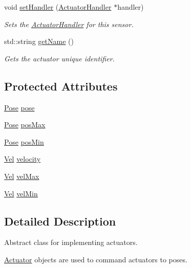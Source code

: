 \begin{DoxyCompactItemize}
void \hyperlink{classrlib_1_1Actuator_af3c3a5a5de2ab54d6b06fe223ec5e7e6}{set\-Handler} (\hyperlink{classrlib_1_1ActuatorHandler}{Actuator\-Handler} $\ast$handler)
\begin{DoxyCompactList}\small\item\em Sets the \hyperlink{classrlib_1_1ActuatorHandler}{Actuator\-Handler} for this sensor. \end{DoxyCompactList}\item 
std\-::string \hyperlink{classrlib_1_1Actuator_af4694ce3e4474e27bda1ed39cc048b6e}{get\-Name} ()
\begin{DoxyCompactList}\small\item\em Gets the actuator unique identifier. \end{DoxyCompactList}\end{DoxyCompactItemize}
\subsection*{Protected Attributes}
\begin{DoxyCompactItemize}
\item 
\hyperlink{classrlib_1_1Pose}{Pose} \hyperlink{classrlib_1_1Actuator_adcce3f106abc4127382d0d9794bb7b15}{pose}
\item 
\hyperlink{classrlib_1_1Pose}{Pose} \hyperlink{classrlib_1_1Actuator_ae0dd994c7e78e9db5580ea23d1361f4e}{pos\-Max}
\item 
\hyperlink{classrlib_1_1Pose}{Pose} \hyperlink{classrlib_1_1Actuator_a4ab8363fb4cfe849f1bb89720387d222}{pos\-Min}
\item 
\hyperlink{classrlib_1_1Vel}{Vel} \hyperlink{classrlib_1_1Actuator_a27372af2dd629e7b434eb541de0a13a8}{velocity}
\item 
\hyperlink{classrlib_1_1Vel}{Vel} \hyperlink{classrlib_1_1Actuator_a54b50a2b0f4cb61a4e5c70fa72a126dc}{vel\-Max}
\item 
\hyperlink{classrlib_1_1Vel}{Vel} \hyperlink{classrlib_1_1Actuator_ad8d95d72f27494890e16ed4ab6045f20}{vel\-Min}
\end{DoxyCompactItemize}


\subsection{Detailed Description}
Abstract class for implementing actuators. 

\hyperlink{classrlib_1_1Actuator}{Actuator} objects are used to command actuators to poses. 

